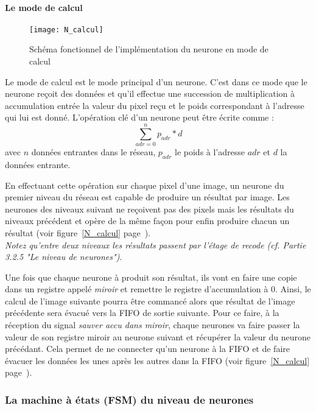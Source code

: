 	\paragraph{Le mode de calcul\\}
	\begin{figure}[h!]
		\begin{center}
			\texttt{[image: N\_calcul]}
			\caption{Schéma fonctionnel de l'implémentation du neurone en mode de calcul}
			\label{fig:N_calcul}
		\end{center}
	\end{figure}

	Le mode de calcul est le mode principal d'un neurone. C'est dans ce mode que le neurone
	reçoit des données et qu'il effectue une succession de multiplication à accumulation entrée
	la valeur du pixel reçu et le poids correspondant à l'adresse qui lui est donné. L'opération clé
	d'un neurone peut être écrite comme :
	$$\sum_{adr=0}^n p_{adr}*d$$
	avec $n$ données entrantes dans le réseau, $p_{adr}$ le poids à l'adresse $adr$
	et $d$ la données entrante.

	En effectuant cette opération sur chaque pixel d'une image, un neurone du premier niveau du réseau
	est capable de produire un résultat par image. Les neurones des niveaux suivant ne reçoivent
	pas des pixels mais les résultats du niveaux précédent et opère de la même façon pour enfin
	produire chacun un résultat (voir figure~\ref{N_calcul} page~\pageref{N_calcul}).
	\\{\em Notez qu'entre deux niveaux les résultats passent par l'étage de recode
	(cf. Partie 3.2.5 "Le niveau de neurones")}.

	Une fois que chaque neurone à produit son résultat, ils vont en faire une copie dans
	un registre appelé {\em miroir} et remettre le registre d'accumulation à 0. Ainsi,
	le calcul de l'image suivante pourra être commancé alors que résultat de l'image précédente
	sera évacué vers la FIFO de sortie suivante. Pour ce faire, à la réception du signal
	{\em sauver accu dans miroir}, chaque neurones va faire passer la valeur de son
	registre miroir au neurone suivant et récupérer la valeur du neurone précédant.
	Cela permet de ne connecter qu'un neurone à la FIFO
	et de faire évacuer les données les unes après les autres dans la FIFO
	(voir figure~\ref{N_calcul} page~\pageref{N_calcul}).

\subsubsection{La machine à états (FSM) du niveau de neurones}

